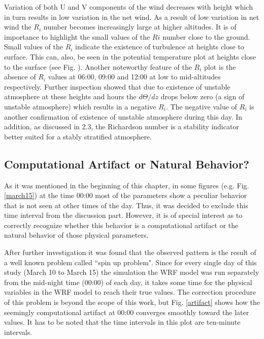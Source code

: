 \documentclass[a4paper,12pt]{article}
\numberwithin{equation}{section} %
\begin{document}
Variation of both U and V components of the wind decreases with height which in turn results in low variation in the net wind. As a result of low variation in net wind the $R_i$ number becomes increasingly large at higher altitudes. It is of importance to highlight the small values of the $Ri$ number close to the ground. Small values of the $R_i$ indicate the existence of turbulence at heights close to surface. This can, also, be seen in the potential temperature plot at heights close to the surface (see Fig. ). Another noteworthy feature of the $R_i$ plot is the absence of $R_i$ values at 06:00, 09:00 and 12:00 at low to mid-altitudes respectively. Further inspection showed that due to existence of unstable atmosphere at these heights and hours the $d\Theta/dz$ drops below zero (a sign of unstable atmosphere) which results in a negative $R_i$. The negative value of $R_i$ is another confirmation of existence of unstable atmosphere during this day. In addition, as discussed in 2.3, the Richardson number is a stability indicator better suited for a stably stratified atmosphere.

\subsection{Computational Artifact or Natural Behavior?}

As it was mentioned in the beginning of this chapter, in some figures (e.g. Fig. \ref{march15}) at the time 00:00 most of the parameters show a peculiar behavior that is not seen at other times of the day. Thus, it was decided to exclude this time interval from the discussion part. However, it is of special interest as to correctly recognize whether this behavior is a computational artifact or the natural behavior of those physical parameters. 

After further investigation it was found that the observed pattern is the result of a well known problem called ``spin up problem". Since for every single day of this study (March 10 to March 15) the simulation the WRF model was run separately from the mid-night time (00:00) of each day, it takes some time for the physical variables in the WRF model to reach their true values. The correction procedure of this problem is beyond the scope of this work, but Fig. \ref{artifact} shows how the seemingly computational artifact at 00:00 converges smoothly toward the later values. It has to be noted that the time intervals in this plot are ten-minute intervals.
\end{document}
